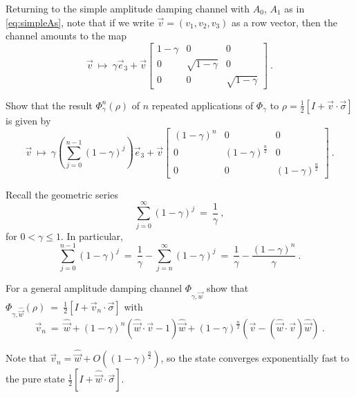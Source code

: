 \documentclass[12pt]{amsart}
\numberwithin{equation}{section}
\numberwithin{figure}{section}
\theoremstyle{theorem}
\begin{document}
Returning to the simple amplitude damping channel with $A_0$, $A_1$ as in 
\eqref{eq:simpleAs}, note that if we write $\vec{v}=(v_1,v_2,v_3)$ as a row 
vector, then the channel amounts to the map
$$\vec{v} \ \mapsto \ \gamma \vec{e}_3 + \vec{v} \begin{bmatrix} 1-\gamma & 0 & 
0 \\ 0 & \sqrt{1-\gamma} & 0 \\
	0 & 0 & \sqrt{1-\gamma} \end{bmatrix} \ . $$
\begin{exer} Show that the result $\Phi_\gamma^n(\rho)$ of $n$ repeated 
applications of $\Phi_\gamma$ to $\rho=\frac{1}{2}[I + \vec{v}\cdot 
\vec{\sigma}]$ is 
given by
$$\vec{v}  \ \mapsto \ \gamma \left(\sum_{j=0}^{n-1} (1-\gamma)^j \right) 
\vec{e}_3 + \vec{v} 
\begin{bmatrix} (1-\gamma)^{n} & 0 & 
	0 \\ 0 &( 1-\gamma)^{\frac{n}{2}} & 0 \\
	0 & 0 & ( 1-\gamma)^{\frac{n}{2}} \end{bmatrix} \ . $$
\end{exer}
Recall the geometric series
$$\sum_{j=0}^{\infty} (1-\gamma)^j \ = \ \frac{1}{\gamma} \ , $$
for $0 < \gamma \le 1$.  In particular,
$$\sum_{j=0}^{n-1} (1-\gamma)^j \ = \ \frac{1}{\gamma} - \sum_{j=n}^\infty 
(1-\gamma)^j \ = 
\ \frac{1}{\gamma} - \frac{(1-\gamma)^n}{\gamma} \ . $$
\begin{exer} For a general amplitude damping channel 
$\Phi_{\gamma,\hat{\vec{w}}}$ show that $\Phi_{\gamma,\hat{\vec{w}}}(\rho)\ = 
\ 
\frac{1}{2}[I + \vec{v}_n\cdot 
	\vec{\sigma}]$ with 
	$$ \vec{v}_n \ = \ \hat{\vec{w}} + (1-\gamma)^n ( \hat{\vec{w}}\cdot 
	\vec{v} -1 )\hat{\vec{w}} + (1-\gamma)^{\frac{n}{2}} (\vec{v}- 
	(\hat{\vec{w}}\cdot \vec{v}) \hat{\vec{w}}) \ . $$
	\end{exer}
Note that $\vec{v}_n = \hat{\vec{w}} + O((1-\gamma)^{\frac{n}{2}})$, so the 
state converges exponentially fast to the pure state $\frac{1}{2}[I + 
\hat{\vec{w}}\cdot \vec{\sigma}]$. 
\end{document}
